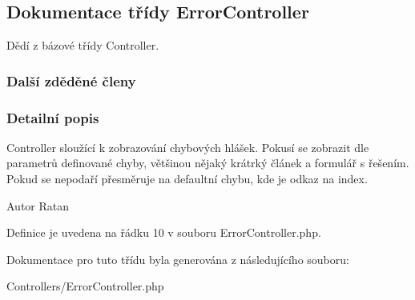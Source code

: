 \hypertarget{class_error_controller}{\subsection{Dokumentace třídy Error\-Controller}
\label{class_error_controller}
}


Dědí z bázové třídy Controller.

\subsubsection*{Další zděděné členy}


\subsubsection{Detailní popis}
Controller sloužící k zobrazování chybových hlášek. Pokusí se zobrazit dle parametrů definované chyby, většinou nějaký krátrký článek a formulář s řešením. Pokud se nepodaří přesměruje na defaultní chybu, kde je odkaz na index. \begin{DoxyAuthor}{Autor}
Ratan 
\end{DoxyAuthor}


Definice je uvedena na řádku 10 v souboru Error\-Controller.\-php.



Dokumentace pro tuto třídu byla generována z následujícího souboru\-:\begin{DoxyCompactItemize}
\item 
Controllers/Error\-Controller.\-php\end{DoxyCompactItemize}
